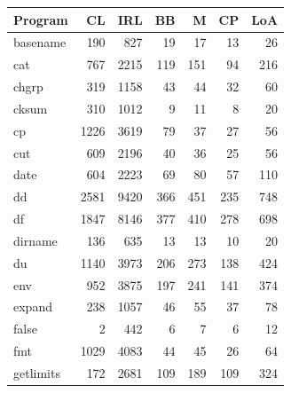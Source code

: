\begin{longtable}{lrrrrrr}
    \toprule 
    Program         & CL         & IRL & BB & M & CP & LoA  \\
    \midrule 
    basename        & 190        & 827      & 19              & 17              & 13             & 26       \\
    cat             & 767        & 2215     & 119             & 151             & 94             & 216      \\
    chgrp           & 319        & 1158     & 43              & 44              & 32             & 60       \\
    cksum           & 310        & 1012     & 9               & 11              & 8              & 20       \\
    cp              & 1226       & 3619     & 79              & 37              & 27             & 56       \\
    cut             & 609        & 2196     & 40              & 36              & 25             & 56       \\
    date            & 604        & 2223     & 69              & 80              & 57             & 110      \\
    dd              & 2581       & 9420     & 366             & 451             & 235            & 748      \\
    df              & 1847       & 8146     & 377             & 410             & 278            & 698      \\
    dirname         & 136        & 635      & 13              & 13              & 10             & 20       \\
    du              & 1140       & 3973     & 206             & 273             & 138            & 424      \\
    env             & 952        & 3875     & 197             & 241             & 141            & 374      \\
    expand          & 238        & 1057     & 46              & 55              & 37             & 78       \\
    false           & 2          & 442      & 6               & 7               & 6              & 12       \\
    fmt             & 1029       & 4083     & 44              & 45              & 26             & 64       \\
    getlimits       & 172        & 2681     & 109             & 189             & 109            & 324      \\

\end{longtable}
